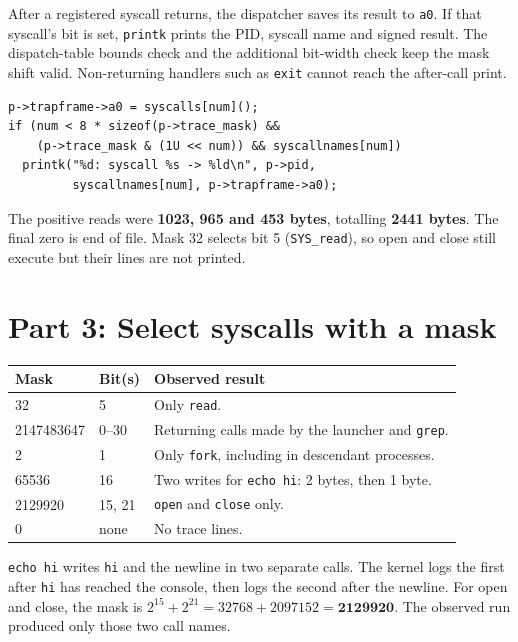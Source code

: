 After a registered syscall returns, the dispatcher saves its result to \texttt{a0}. If that syscall's bit is set, \texttt{printk} prints the PID, syscall name and signed result. The dispatch-table bounds check and the additional bit-width check keep the mask shift valid. Non-returning handlers such as \texttt{exit} cannot reach the after-call print.

\begin{lstlisting}[style=source]
p->trapframe->a0 = syscalls[num]();
if (num < 8 * sizeof(p->trace_mask) &&
    (p->trace_mask & (1U << num)) && syscallnames[num])
  printk("%d: syscall %s -> %ld\n", p->pid,
         syscallnames[num], p->trapframe->a0);
\end{lstlisting}


The positive reads were \textbf{1023, 965 and 453 bytes}, totalling \textbf{2441 bytes}. The final zero is end of file. Mask 32 selects bit 5 (\texttt{SYS\_read}), so open and close still execute but their lines are not printed.

\clearpage
\section{Part 3: Select syscalls with a mask}

\begin{table}[H]\centering\small
\begin{tabular}{@{}llp{}@{}}
\toprule
Mask & Bit(s) & Observed result \\
\midrule
32 & 5 & Only \texttt{read}. \\
2147483647 & 0--30 & Returning calls made by the launcher and \texttt{grep}. \\
2 & 1 & Only \texttt{fork}, including in descendant processes. \\
65536 & 16 & Two writes for \texttt{echo hi}: 2 bytes, then 1 byte. \\
2129920 & 15, 21 & \texttt{open} and \texttt{close} only. \\
0 & none & No trace lines. \\
\bottomrule
\end{tabular}
\end{table}

\texttt{echo hi} writes \texttt{hi} and the newline in two separate calls. The kernel logs the first after \texttt{hi} has reached the console, then logs the second after the newline. For open and close, the mask is $2^{15} + 2^{21} = 32768 + 2097152 = \mathbf{2129920}$. The observed run produced only those two call names.

